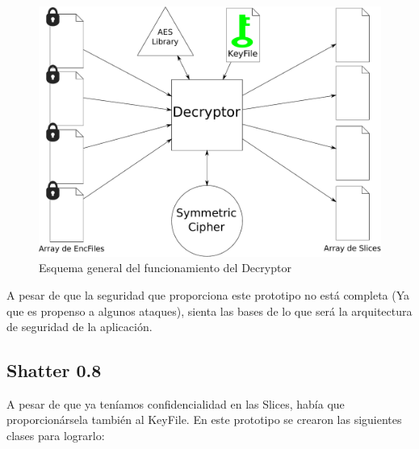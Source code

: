 \begin{figure}[ht]
  \centering
  \includegraphics[scale=0.5]{Figures/Decryptor}
  \decoRule
  \caption[Decryptor]{Esquema general del funcionamiento del Decryptor}
  \label{fig:Decryptor}
\end{figure}

A pesar de que la seguridad que proporciona este prototipo no está completa (Ya
que es propenso a algunos ataques), sienta las bases de lo que será
la arquitectura de seguridad de la aplicación.

\subsection{Shatter 0.8}

A pesar de que ya teníamos confidencialidad en las Slices, había que
proporcionársela también al KeyFile. En este prototipo se crearon las siguientes
clases para lograrlo:

